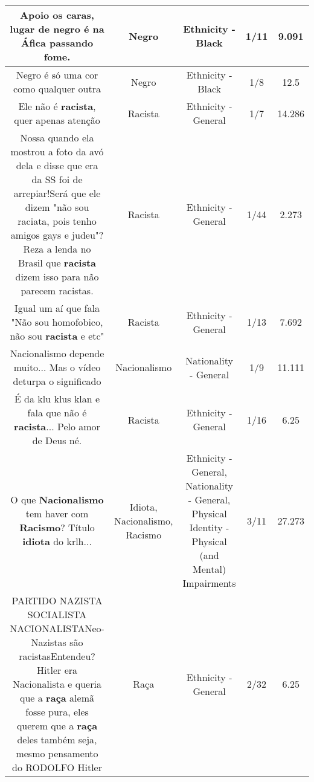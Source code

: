 \documentclass[11pt]{article}
\newlength\mylength
\begin{document}
\begin{center}
\begin{longtable}{|C{.65\mylength}|C{.30\mylength}|C{.12\mylength}|C{.12\mylength}|C{.12\mylength}|}
  \small Apoio os caras, lugar de \textbf{negro} é na Áfica passando fome.\normalsize   & Negro & Ethnicity - Black & 1/11 & 9.091 \\  \hline
  \small Negro é só uma cor como qualquer outra\normalsize   & Negro & Ethnicity - Black & 1/8 & 12.5 \\  \hline
  \small Ele não é \textbf{racista}, quer apenas atenção\normalsize   & Racista & Ethnicity - General & 1/7 & 14.286 \\  \hline
  \small Nossa quando ela mostrou a foto da avó dela e disse que era da SS foi de arrepiar!Será que ele dizem "não sou raciata, pois tenho amigos gays e judeu"? Reza a lenda no Brasil que \textbf{racista} dizem isso para não parecem racistas.\normalsize   & Racista & Ethnicity - General & 1/44 & 2.273 \\  \hline
  \small Igual um aí que fala "Não sou homofobico,  não sou \textbf{racista} e etc"\normalsize   & Racista & Ethnicity - General & 1/13 & 7.692 \\  \hline
  \small Nacionalismo depende muito... Mas o vídeo deturpa o significado\normalsize   & Nacionalismo & Nationality - General & 1/9 & 11.111 \\  \hline
  \small É da klu klus klan e fala que não é \textbf{racista}... Pelo amor de Deus né.\normalsize   & Racista & Ethnicity - General & 1/16 & 6.25 \\  \hline
  \small O que \textbf{Nacionalismo} tem haver com \textbf{Racismo}? Título \textbf{idiota} do krlh...\normalsize   & Idiota, Nacionalismo, Racismo & Ethnicity - General, Nationality - General, Physical Identity - Physical (and Mental) Impairments & 3/11 & 27.273 \\  \hline
  \small PARTIDO NAZISTA SOCIALISTA NACIONALISTANeo-Nazistas são racistasEntendeu?Hitler era Nacionalista e queria que a \textbf{raça} alemã fosse pura, eles querem que a \textbf{raça} deles também seja, mesmo pensamento do RODOLFO Hitler\normalsize   & Raça & Ethnicity - General & 2/32 & 6.25 \\  \hline

\end{longtable}
\end{center}
\end{document}
